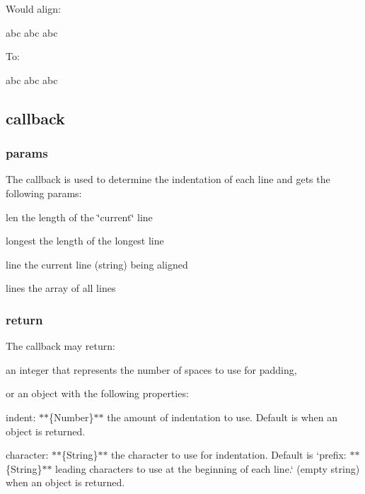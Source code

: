 Would align\+:


\begin{DoxyCode}
abc
abc
abc
\end{DoxyCode}


To\+:


\begin{DoxyCode}
abc
abc
abc
\end{DoxyCode}


\subsection*{callback}

\subsubsection*{params}

The callback is used to determine the indentation of each line and gets the following params\+:


\begin{DoxyItemize}
\item {\ttfamily len} the length of the \char`\"{}current\char`\"{} line
\item {\ttfamily longest} the length of the longest line
\item {\ttfamily line} the current line (string) being aligned
\item {\ttfamily lines} the array of all lines
\end{DoxyItemize}

\subsubsection*{return}

The callback may return\+:


\begin{DoxyItemize}
\item an integer that represents the number of spaces to use for padding,
\item or an object with the following properties\+:
\begin{DoxyItemize}
\item {\ttfamily indent}\+: $\ast$$\ast$\{Number\}$\ast$$\ast$ the amount of indentation to use. Default is {} when an object is returned.
\item {\ttfamily character}\+: $\ast$$\ast$\{String\}$\ast$$\ast$ the character to use for indentation. Default is `\textquotesingle{}prefix{\ttfamily \+: $\ast$$\ast$\{String\}$\ast$$\ast$ leading characters to use at the beginning of each line.}\textquotesingle{}\textquotesingle{}` (empty string) when an object is returned.
\end{DoxyItemize}
\end{DoxyItemize}

